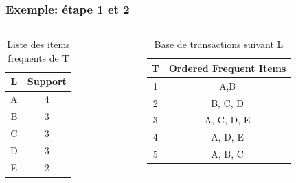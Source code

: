 \documentclass{beamer}
\begin{document}
\frame
{
  \frametitle{Exemple: étape 1 et 2}
 
 \begin{columns} 
    \begin{column}{.5\textwidth}
  			\begin{table}[htp]
			\caption{Liste des items frequents de T }
			\begin{center}
				\begin{tabular}{|c|c|}
				\hline
				\textbf{L} & \textbf{Support} \\
				\hline
				A & 4\\
				\hline
				B & 3 \\
				\hline
				C & 3 \\
				\hline
				D & 3 \\
				\hline
				E & 2 \\
				\hline
				\end{tabular}
			\end{center}
			\label{Liste des items frequents de T }
			\end{table}%
    \end{column}
    \begin{column}{.5\textwidth}
  			\begin{table}[htp]
			\caption{Base de transactions  suivant L}
			\begin{center}
				\begin{tabular}{|c|c|}
				\hline
				\textbf{T} & \textbf{Ordered Frequent Items} \\
				\hline
				1 & A,B \\
				\hline
				2 & B, C, D \\
				\hline
				3 & A, C, D, E\\
				\hline
				4 & A, D, E \\
				\hline
				5 & A, B, C \\
				\hline
				\end{tabular}
			\end{center}
			\label{Base de transactions suivant L}
			\end{table}%
    \end{column}%
    
\end{columns}
}
\end{document}
